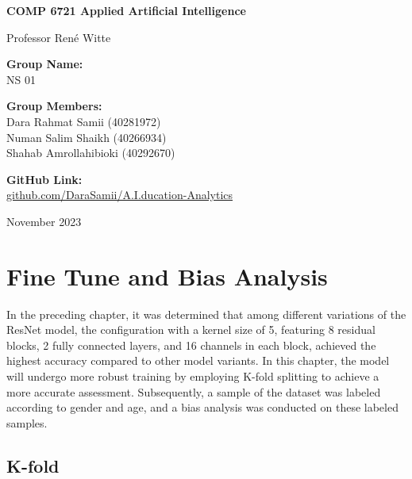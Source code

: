 \documentclass[]{report}
\begin{document}
\begin{titlepage}
	\begin{center}
		\vspace*{1cm}

		
		
		\vspace*{2cm}
		
		\textbf{\Large COMP 6721 Applied Artificial Intelligence}
		
		\vspace{0.5cm}
		Professor René Witte
		
		\vspace{1.5cm}
		\textbf{Group Name:}\\
		NS 01
		\vspace{1.5cm}
		
		\textbf{Group Members:}\\
		Dara Rahmat Samii (40281972)\\ Numan Salim Shaikh (40266934) \\ Shahab Amrollahibioki (40292670)
		
		
		\vfill
		
		\textbf{GitHub Link:}\\
		\href{https://github.com/DaraSamii/A.I.ducation-Analytics}{github.com/DaraSamii/A.I.ducation-Analytics}
		
		\vfill

		
		November 2023
		
	\end{center}
\end{titlepage}
\newpage




\chapter{Fine Tune and Bias Analysis}

In the preceding chapter, it was determined that among different variations of the ResNet model, the configuration with a kernel size of 5, featuring 8 residual blocks, 2 fully connected layers, and 16 channels in each block, achieved the highest accuracy compared to other model variants. In this chapter, the model will undergo more robust training by employing K-fold splitting to achieve a more accurate assessment. Subsequently, a sample of the dataset was labeled according to gender and age, and a bias analysis was conducted on these labeled samples.
\section{K-fold}
\end{document}
